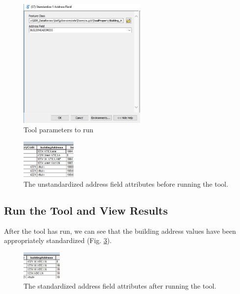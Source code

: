 \documentclass[openany]{book}
\theoremstyle{definition}
\theoremstyle{definition}
\theoremstyle{definition}
\theoremstyle{remark}
\begin{document}
\begin{figure}[H]

{\centering \includegraphics[width=2.48in,]{figures/std1-toolparams} 

}

\caption{Tool parameters to run}\label{fig:std1params}
\end{figure}\begin{figure}[H]

{\centering \includegraphics[width=1.06in,]{figures/std1-before} 

}

\caption{The unstandardized address field attributes before running the tool.}\label{fig:std1before}
\end{figure}

\subsection{Run the Tool and View
Results}\label{run-the-tool-and-view-results-7}

After the tool has run, we can see that the building address values have
been appropriately standardized (Fig. \ref{fig:std1after}).

\begin{figure}[H]

{\centering \includegraphics[width=0.77in,]{figures/std1-after} 

}

\caption{The standardized address field attributes after running the tool.}\label{fig:std1after}
\end{figure}
\end{document}
